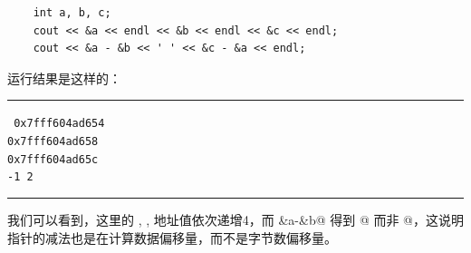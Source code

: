 \begin{lstlisting}
    int a, b, c;
    cout << &a << endl << &b << endl << &c << endl;
    cout << &a - &b << ' ' << &c - &a << endl;
\end{lstlisting}
运行结果是这样的：\\\noindent\rule{\linewidth}{0.2pt}\texttt{
0x7fff604ad654\\
0x7fff604ad658\\
0x7fff604ad65c\\
-1 2
}\\\noindent\rule{\linewidth}{0.2pt}
我们可以看到，这里的 \lstinline@a@, \lstinline@b@, \lstinline@c@ 地址值依次递增4，而 \lstinline@&a-&b@ 得到 @ 而非 @，这说明指针的减法也是在计算数据偏移量，而不是字节数偏移量。\par
